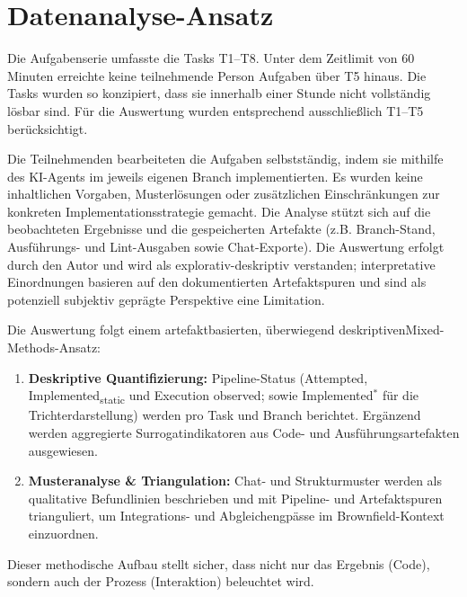 \section{Datenanalyse-Ansatz}
Die Aufgabenserie umfasste die Tasks T1–T8. Unter dem Zeitlimit von 60 Minuten erreichte keine teilnehmende Person Aufgaben über T5 hinaus. Die Tasks wurden so konzipiert, dass sie innerhalb einer Stunde nicht vollständig lösbar sind. Für die Auswertung wurden entsprechend ausschließlich T1–T5 berücksichtigt.

Die Teilnehmenden bearbeiteten die Aufgaben selbstständig, indem sie mithilfe des KI-Agents im jeweils eigenen Branch implementierten. Es wurden keine inhaltlichen Vorgaben, Musterlösungen oder zusätzlichen Einschränkungen zur konkreten Implementationsstrategie gemacht. Die Analyse stützt sich auf die beobachteten Ergebnisse und die gespeicherten Artefakte (z.B. Branch-Stand, Ausführungs- und Lint-Ausgaben sowie Chat-Exporte). Die Auswertung erfolgt durch den Autor und wird als explorativ-deskriptiv verstanden; interpretative Einordnungen basieren auf den dokumentierten Artefaktspuren und sind als potenziell subjektiv geprägte Perspektive eine Limitation.

Die Auswertung folgt einem artefaktbasierten, überwiegend deskriptiven\linebreak \mbox{Mixed-Methods-Ansatz}:

\begin{enumerate}
  \item {\bfseries Deskriptive Quantifizierung:} Pipeline-Status (Attempted, Implemented\textsubscript{static} und Execution observed; sowie Implemented$^\ast$ für die Trichterdarstellung) werden pro Task und Branch berichtet. Ergänzend werden aggregierte Surrogatindikatoren aus Code- und Ausführungsartefakten ausgewiesen.
  \item {\bfseries Musteranalyse \& Triangulation:} Chat- und Strukturmuster werden als qualitative Befundlinien beschrieben und mit Pipeline- und Artefaktspuren trianguliert, um Integrations- und Abgleichengpässe im Brownfield-Kontext einzuordnen.
\end{enumerate}

Dieser methodische Aufbau stellt sicher, dass nicht nur das Ergebnis (Code), sondern auch der Prozess (Interaktion) beleuchtet wird.
